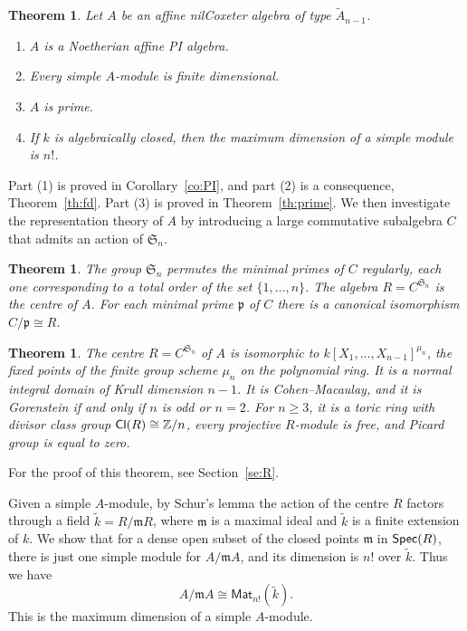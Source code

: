 \documentclass[12pt]{amsart}
\newcommand{\Cl}{\operatorname{\sf Cl}}
\renewcommand{\ge}{\geqslant}
\newcommand{\Mat}{\mathsf{Mat}}
\newcommand{\Spec}{\operatorname{\sf Spec}}
\newcommand{\sym}[1]{\mathfrak{S}_{#1}}
\newcommand{\bZ}{{\mathbb{Z}}}
\newcommand{\mfm}{\mathfrak{m}}
\newcommand{\mfp}{\mathfrak{p}}
\numberwithin{equation}{section}
\newtheorem{theorem}[equation]{Theorem}
\theoremstyle{definition}
\begin{document}
\begin{theorem}
Let $A$ be an affine nilCoxeter algebra of type $\tilde A_{n-1}$. 
\begin{enumerate}
\item $A$ is a Noetherian affine PI algebra.
\item Every simple $A$-module is finite dimensional. 
\item $A$ is prime.
\item If $k$
is algebraically closed, then the 
maximum dimension of a simple module is $n!$. 
\end{enumerate}
\end{theorem}

Part (1) is proved in Corollary~\ref{co:PI}, and part (2)
is a consequence, Theorem~\ref{th:fd}. Part (3) is proved in
Theorem~\ref{th:prime}.
We then investigate the representation theory of $A$ by introducing a
large commutative subalgebra $C$ that admits an action of
$\sym{n}$.

\begin{theorem}
The group $\sym{n}$ permutes the minimal primes of $C$ regularly, each
one corresponding to a total order of the set $\{1,\dots,n\}$.
The algebra $R=C^{\sym{n}}$ is the centre of $A$. For each minimal
prime $\mfp$ of $C$ there is a canonical isomorphism $C/\mfp\cong R$.
\end{theorem}

\begin{theorem}
The centre $R=C^{\sym{n}}$ of $A$ is isomorphic to
$k[X_1,\dots,X_{n-1}]^{\mu_n}$, the fixed points of the finite group
scheme $\mu_n$ on the polynomial ring. It is 
a normal integral domain of Krull
dimension $n-1$. It is Cohen--Macaulay, and it is Gorenstein if and
only if $n$ is odd or $n=2$. For $n\ge 3$, it is a
toric ring with divisor class group $\Cl(R)\cong \bZ/n$, every projective $R$-module is free, and Picard group is equal to zero.
\end{theorem}

For the proof of this theorem, see Section~\ref{se:R}.\bigskip\pagebreak[3]

Given a simple $A$-module, by Schur's lemma the action of the centre
$R$ factors through a field $\tilde k=R/\mfm R$, where $\mfm$ is a
maximal ideal and $\tilde k$ is a finite extension of $k$.
We show that for a dense open subset of the closed points $\mfm$ in
$\Spec(R)$, there is just one simple module for $A/\mfm A$, and its
dimension is $n!$ over $\tilde k$. Thus we have 
\[ A/\mfm A\cong\Mat_{n!}(\tilde k). \]
This is the maximum dimension of a simple $A$-module.
\end{document}
